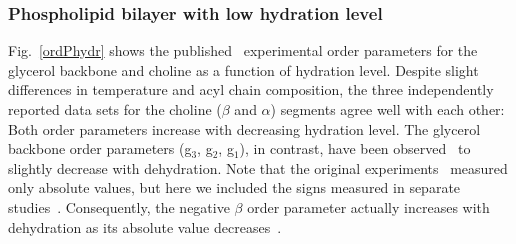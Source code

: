 \documentclass[journal=jpcbfk,manuscript=article]{achemso}
\begin{document}
\subsubsection{Phospholipid bilayer with low hydration level}
Fig.~\ref{ordPhydr} shows the published~\cite{dvinskikh05b,ulrich94,bechinger91} experimental order parameters
for the glycerol backbone and choline as a function of hydration level.
Despite slight differences in temperature and acyl chain composition,
the three independently reported data sets for the choline ($\beta$ and $\alpha$) segments agree well with each other:
Both order parameters increase with decreasing hydration level.
The glycerol backbone order parameters (g$_{3}$, g$_{2}$, g$_{1}$), in contrast,
have been observed~\cite{dvinskikh05b} to slightly decrease with dehydration.
Note that the original experiments~\cite{dvinskikh05b,ulrich94,bechinger91} measured only 
absolute values, but here
we included the signs measured in separate studies~\cite{hong95a,hong95b,gross97}. 
Consequently, the negative $\beta$ order parameter actually increases with dehydration 
as its absolute value decreases~\cite{dvinskikh05b,ulrich94,bechinger91}.
\end{document}
